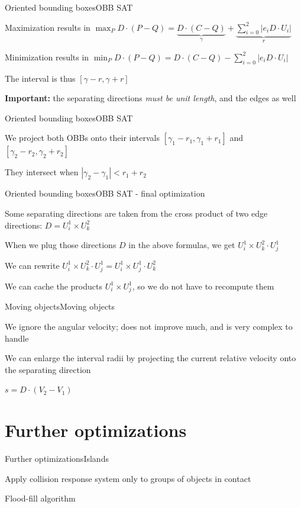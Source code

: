 \documentclass{beamer}
\begin{document}
\begin{slide}{Oriented bounding boxes}{OBB SAT}{
\item Maximization results in $\max_P D \cdot (P - Q) = \underbrace{D \cdot (C - Q)}_{\gamma} + \underbrace{\sum_{i=0}^2 |e_i D \cdot U_i|}_{r}$
\item Minimization results in $\min_P D \cdot (P - Q) = D \cdot (C - Q) - \sum_{i=0}^2 |e_i D \cdot U_i|$
\item The interval is thus $[\gamma - r, \gamma + r]$
\item \textbf{Important:} the separating directions \textit{must be unit length}, and the edges as well
}\end{slide}

\begin{slide}{Oriented bounding boxes}{OBB SAT}{
\item We project both OBBs onto their intervals $[\gamma_1 - r_1, \gamma_1 + r_1]$ and $[\gamma_2 - r_2, \gamma_2 + r_2]$
\item They intersect when $|\gamma_2 - \gamma_1| < r_1 + r_2$
}\end{slide}

\begin{slide}{Oriented bounding boxes}{OBB SAT - final optimization}{
\item Some separating directions are taken from the cross product of two edge directions: $D = U_i^1 \times U_k^2$
\item When we plug those directions $D$ in the above formulas, we get $U_i^1 \times U_k^2 \cdot U_j^1$
\item We can rewrite $U_i^1 \times U_k^2 \cdot U_j^1 = U_i^1 \times U_j^1 \cdot U_k^2$
\item We can cache the products $U_i^1 \times U_j^1$, so we do not have to recompute them
}\end{slide}

\begin{slide}{Moving objects}{Moving objects}{
\item We ignore the angular velocity; does not improve much, and is very complex to handle
\item We can enlarge the interval radii by projecting the current relative velocity onto the separating direction
\item $s = D \cdot (V_2 - V_1)$
}\end{slide}

\section{Further optimizations}
\begin{slide}{Further optimizations}{Islands}{
\item Apply collision response system only to groups of objects in contact
\item Flood-fill algorithm
}\end{slide}
\end{document}
